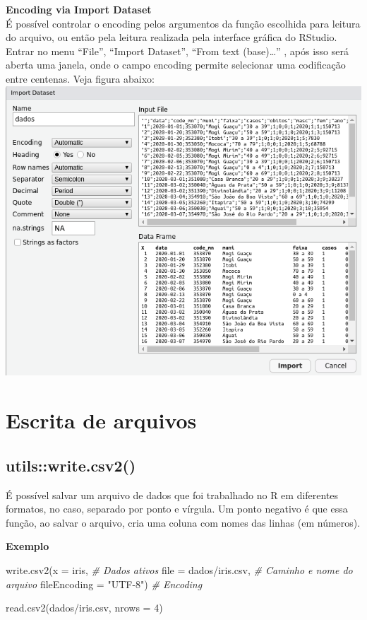 \documentclass[
]{book}
\newenvironment{Shaded}{\begin{snugshade}}{\end{snugshade}}
\newcommand{\AttributeTok}[1]{\textcolor[rgb]{0.77,0.63,0.00}{#1}}
\newcommand{\CommentTok}[1]{\textcolor[rgb]{0.56,0.35,0.01}{\textit{#1}}}
\newcommand{\DecValTok}[1]{\textcolor[rgb]{0.00,0.00,0.81}{#1}}
\newcommand{\FunctionTok}[1]{\textcolor[rgb]{0.00,0.00,0.00}{#1}}
\newcommand{\NormalTok}[1]{#1}
\newcommand{\StringTok}[1]{\textcolor[rgb]{0.31,0.60,0.02}{#1}}
\theoremstyle{definition}
\theoremstyle{definition}
\theoremstyle{definition}
\theoremstyle{definition}
\theoremstyle{remark}
\begin{document}
\textbf{Encoding via Import Dataset}\\
É possível controlar o encoding pelos argumentos da função escolhida para leitura do arquivo, ou então pela leitura realizada pela interface gráfica do RStudio. Entrar no menu ``File'', ``Import Dataset'', ``From text (base)\ldots{}'' , após isso será aberta uma janela, onde o campo encoding permite selecionar uma codificação entre centenas. Veja figura abaixo:
\includegraphics{ilustracoes/import_dataset.png}

\hypertarget{escrita-de-arquivos}{%
\section{Escrita de arquivos}\label{escrita-de-arquivos}}

\hypertarget{utilswrite.csv2}{%
\subsection{utils::write.csv2()}\label{utilswrite.csv2}}

É possível salvar um arquivo de dados que foi trabalhado no R em diferentes formatos, no caso, separado por ponto e vírgula. Um ponto negativo é que essa função, ao salvar o arquivo, cria uma coluna com nomes das linhas (em números).

\textbf{Exemplo}

\begin{Shaded}
\begin{Highlighting}[]
\FunctionTok{write.csv2}\NormalTok{(}\AttributeTok{x =}\NormalTok{ iris,                }\CommentTok{\# Dados ativos}
           \AttributeTok{file =} \StringTok{\textquotesingle{}dados/iris.csv\textquotesingle{}}\NormalTok{, }\CommentTok{\# Caminho e nome do arquivo}
           \AttributeTok{fileEncoding =} \StringTok{"UTF{-}8"}\NormalTok{)  }\CommentTok{\# Encoding}

\FunctionTok{read.csv2}\NormalTok{(}\StringTok{\textquotesingle{}dados/iris.csv\textquotesingle{}}\NormalTok{, }\AttributeTok{nrows =} \DecValTok{4}\NormalTok{)}
\end{Highlighting}
\end{Shaded}
\end{document}
